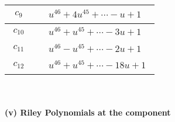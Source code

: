 \documentclass[1p]{elsarticle_modified}
\theoremstyle{definition}
\begin{document}
\begin{tabular}{m{50pt}|m{274pt}}
\hline $$\begin{aligned}c_{9}\end{aligned}$$&$\begin{aligned}
&u^{46}+4 u^{45}+\cdots- u+1
\end{aligned}$\\
\hline $$\begin{aligned}c_{10}\end{aligned}$$&$\begin{aligned}
&u^{46}+u^{45}+\cdots-3 u+1
\end{aligned}$\\
\hline $$\begin{aligned}c_{11}\end{aligned}$$&$\begin{aligned}
&u^{46}- u^{45}+\cdots-2 u+1
\end{aligned}$\\
\hline $$\begin{aligned}c_{12}\end{aligned}$$&$\begin{aligned}
&u^{46}+u^{45}+\cdots-18 u+1
\end{aligned}$\\
\hline
\end{tabular}\\~\\
\newpage\renewcommand{\arraystretch}{1}
\flushleft \textbf{(v) Riley Polynomials at the component}\newline \\
\end{document}
